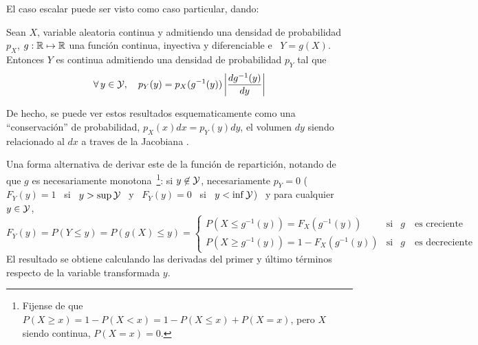 El caso escalar puede ser visto como caso particular, dando:
%
\begin{corolario}
  Sean  $X$,   variable  aleatoria  continua   y  admitiendo  una   densidad  de
  probabilidad $p_X$, $g:\mathbb{R} \mapsto  \mathbb{R}$ una funci\'on continua, inyectiva
  y  diferenciable e  \ $Y  = g(X)$.   Entonces $Y$  es continua  admitiendo una
  densidad de probabilidad $p_Y$ tal que
  \[
  \forall  \,   y  \in  \mathcal{Y},   \quad  p_Y(y)  =  p_X(g^{-1}(y))   \left|  \frac{d
      g^{-1}(y)}{dy} \right|
  \]
\end{corolario}
%
\noindent  De hecho,  se puede  ver estos  resultados esquematicamente  como una
``conservaci\'on'' de  probabilidad, $p_X(x)  dx = p_Y(y)  dy$, el  volumen $dy$
siendo  relacionado  al  $dx$ a  traves  de  la  Jacobiana .

Una forma alternativa de derivar  este  de la
funci\'on   de   repartici\'on,   notando   de   que   $g$   es   necesariamente
monotona~\footnote{Fijense de que $P(X \ge x) = 1 -  P(X < x) = 1 - P(X \le x) +
  P(X =  x)$, pero $X$ siendo  continua, $ P(X =  x) = 0$.}: si  $y \not\in \mathcal{Y}$,
necesariamente $p_Y = 0$ ($F_Y(y) = 1$ \ si \ $y > \sup \mathcal{Y}$ \ y \ $F_Y(y) = 0$ \
si \ $y < \inf \mathcal{Y}$) \ y para cualquier \ $y \in \mathcal{Y}$,
%
\[
F_Y(y) = P(Y \le y) = P(g(X) \le y) =
\left\{\begin{array}{lll}
P(X \le g^{-1}(y)) = F_X(g^{-1}(y)) & \mbox{si} & g \quad \mbox{es creciente}\\[2.5mm]
%
P(X \ge g^{-1}(y)) = 1 - F_X(g^{-1}(y)) & \mbox{si} & g \quad \mbox{es decreciente}
\end{array}\right.
\]
%
El  resultado  se  obtiene  calculando  las  derivadas  del  primer  y  \'ultimo
t\'erminos respecto de la variable transformada $y$.


